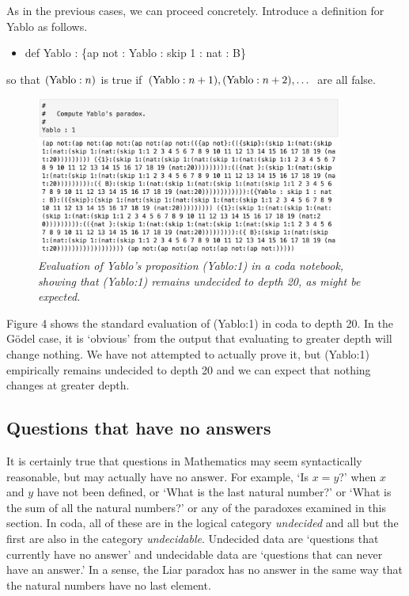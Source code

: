 \documentclass[11pt]{article}
\begin{document}
     As in the previous cases, we can proceed concretely.  Introduce a definition for Yablo as follows.
\begin{itemize}
\item def Yablo : \{ap not : Yablo : skip 1 : nat : B\}
\end{itemize}
so that $({\rm Yablo}:n)$ is true if $({\rm Yablo}:n+1), ({\rm Yablo}:n+2), \dots$ are all false.
\begin{figure}[h]
\centering
\includegraphics[width=0.9\textwidth]{Yablo.png}
\caption{{\it Evaluation of Yablo's proposition (Yablo:1) in a coda notebook, showing that (Yablo:1) remains undecided to depth 20, 
as might be expected.}}
\end{figure}
Figure 4 shows the standard evaluation of (Yablo:1) in coda to depth 20.  In the G\"odel case, it is `obvious' from
the output that evaluating to greater depth will change nothing.  We have not attempted to actually
prove it, but (Yablo:1) empirically remains undecided to depth 20 and we can expect that nothing changes 
at greater depth. 
\subsection {Questions that have no answers} 
    It is certainly true that questions in Mathematics may seem syntactically reasonable, but 
may actually have no answer.  For example, `Is $x=y$?' when $x$ and $y$ have not been defined, or 
`What is the last natural number?' or `What is the sum of all the natural numbers?' or 
any of the paradoxes examined in this section.  In coda, all of these are in the 
logical category {\it undecided} and all but the first are also in the category {\it undecidable}.  
Undecided data are `questions that currently have no answer' and undecidable data are 
`questions that can never have an answer.'  In a sense, the Liar paradox has no answer 
in the same way that the natural numbers have no last element.  
\end{document}
